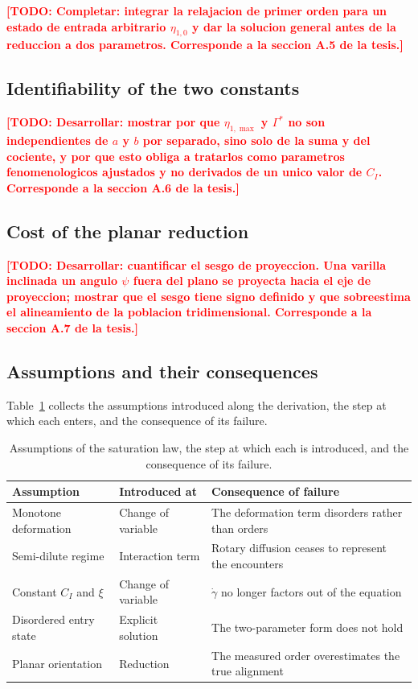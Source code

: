 \documentclass[%
  aip,
  pof,
  reprint,
  floatfix
]{revtex4-2}
\newcommand{\todo}[1]{\textcolor{red}{\textbf{[TODO: #1]}}}
\begin{document}
\todo{Completar: integrar la relajacion de primer orden para un estado de entrada arbitrario $\eta_{1,0}$ y dar la solucion general antes de la reduccion a dos parametros. Corresponde a la seccion A.5 de la tesis.}

\subsection{Identifiability of the two constants}

\todo{Desarrollar: mostrar por que $\eta_{1,\max}$ y $\Gamma^{*}$ no son independientes de $a$ y $b$ por separado, sino solo de la suma y del cociente, y por que esto obliga a tratarlos como parametros fenomenologicos ajustados y no derivados de un unico valor de $C_I$. Corresponde a la seccion A.6 de la tesis.}

\subsection{Cost of the planar reduction}

\todo{Desarrollar: cuantificar el sesgo de proyeccion. Una varilla inclinada un angulo $\psi$ fuera del plano se proyecta hacia el eje de proyeccion; mostrar que el sesgo tiene signo definido y que sobreestima el alineamiento de la poblacion tridimensional. Corresponde a la seccion A.7 de la tesis.}

\subsection{Assumptions and their consequences}

Table~\ref{tab:sup_assumptions} collects the assumptions introduced along the derivation, the step at which each enters, and the consequence of its failure.

\begin{table}[htb]
\centering
\caption{Assumptions of the saturation law, the step at which each is introduced, and the consequence of its failure.}
\label{tab:sup_assumptions}
\begin{tabular}{l l l}
\toprule
\textbf{Assumption} & \textbf{Introduced at} & \textbf{Consequence of failure} \\
\midrule
Monotone deformation      & Change of variable    & The deformation term disorders rather than orders \\
Semi-dilute regime        & Interaction term      & Rotary diffusion ceases to represent the encounters \\
Constant $C_I$ and $\xi$  & Change of variable    & $\dot{\gamma}$ no longer factors out of the equation \\
Disordered entry state    & Explicit solution     & The two-parameter form does not hold \\
Planar orientation        & Reduction             & The measured order overestimates the true alignment \\
\bottomrule
\end{tabular}
\end{table}
\end{document}
